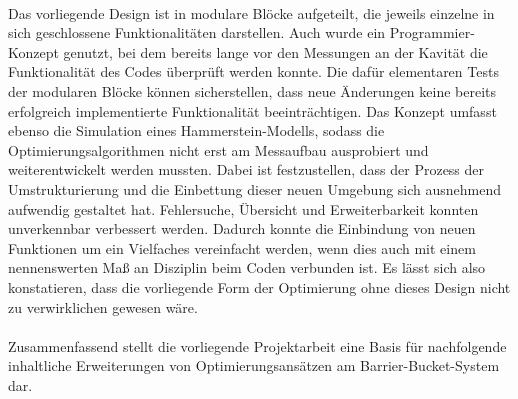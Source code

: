 \documentclass[../Report.tex]{subfiles}
\begin{document}
\\ 
Das vorliegende Design ist in modulare Blöcke aufgeteilt, die jeweils einzelne in sich geschlossene Funktionalitäten darstellen. Auch wurde ein Programmier-Konzept genutzt, bei dem bereits lange vor den Messungen an der Kavität die Funktionalität des Codes überprüft werden konnte. Die dafür elementaren Tests der modularen Blöcke können sicherstellen, dass neue Änderungen keine bereits erfolgreich implementierte Funktionalität beeinträchtigen.
Das Konzept umfasst ebenso die Simulation eines Hammerstein-Modells, sodass die Optimierungsalgorithmen nicht erst am Messaufbau ausprobiert und weiterentwickelt werden mussten.
Dabei ist festzustellen, dass der Prozess der Umstrukturierung und die Einbettung dieser neuen Umgebung sich ausnehmend aufwendig gestaltet hat. Fehlersuche, Übersicht und Erweiterbarkeit konnten unverkennbar verbessert werden. Dadurch konnte die Einbindung von neuen Funktionen um ein Vielfaches vereinfacht werden, wenn dies auch mit einem nennenswerten Maß an Disziplin beim Coden verbunden ist. Es lässt sich also konstatieren, dass die vorliegende Form der Optimierung ohne dieses Design nicht zu verwirklichen gewesen wäre.
\\
\\
Zusammenfassend stellt die vorliegende Projektarbeit eine Basis für nachfolgende inhaltliche Erweiterungen von Optimierungsansätzen am Barrier-Bucket-System dar.
\end{document}
